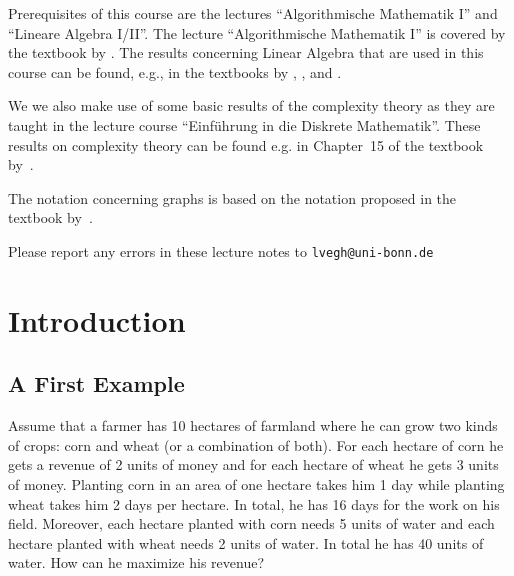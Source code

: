 \documentclass[12pt, showidx, twoside]{article}
\def\OnlineVersion{}
\def\newpage{\par\vfill\eject}
\let\oldsection\section
\def\section{\cleardoublepage\oldsection}
\begin{document}
Prerequisites of this course are the lectures
``Algorithmische Mathematik I'' and
 ``Lineare Algebra I/II''.
The lecture ``Algorithmische Mathematik I'' is covered by the textbook
by \cite{HouV18}. The results concerning Linear Algebra that are used
in this course can be found, e.g., in the textbooks by
\cite{AntH12}, \cite{Bos07}, and \cite{Fis09}.

We we also make use of some basic results of the complexity theory as
they are taught in the lecture course ``Einf\"{u}hrung in die Diskrete Mathematik''.
These results on complexity theory can be found e.g. in Chapter~15 of
the textbook by~\cite{KorV18}.

The notation concerning graphs is based on the notation proposed in the
textbook by~\cite{KorV18}.

Please report any errors in these lecture notes
to {\tt lvegh@uni-bonn.de}

\newpage

\ifdefined\InitialVersion{}\else
\ifdefined\OnlineVersion{}\else
{}
\tableofcontents
{}
\newpage
\fi %
\fi %
\renewcommand{\figurename}{Fig.}



\section{Introduction}

\subsection{A First Example}\label{sec::first_example}


Assume that a farmer has 10 hectares of 
farmland where he can grow two kinds of crops: corn and wheat (or a combination
of both). For each hectare of corn he gets a revenue of 2 units of money
and for each hectare of wheat he gets 3 units of money.
Planting corn in an area of one hectare takes him 1 day while planting wheat
takes him 2 days per hectare. In total, he has 16 days for the work on his 
field.
Moreover, each hectare planted with corn needs 5 units of water and each hectare 
planted with wheat needs 2 units of water. In total he has 40 units of water.
How can he maximize his revenue?
\end{document}
